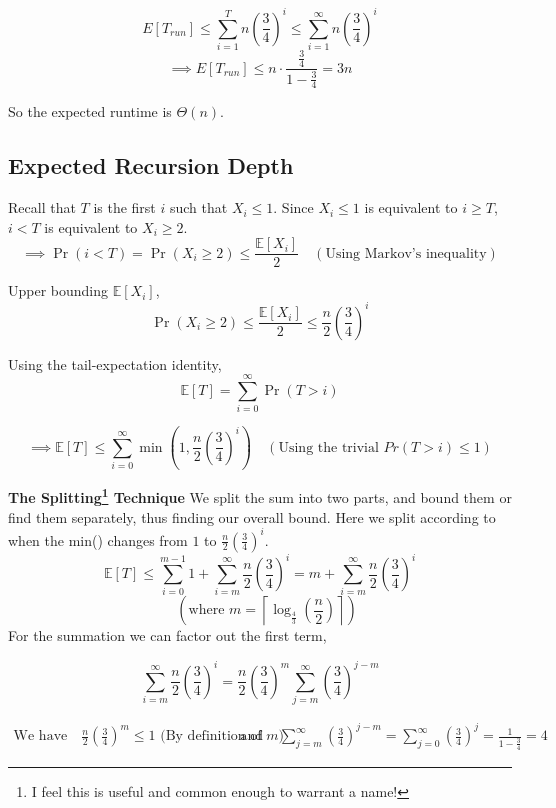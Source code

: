 \documentclass[11pt,openany]{book}
\begin{document}
\[
E[T_{run}] \le \sum_{i=1}^T n (\frac{3}{4})^i \le \sum_{i=1}^{\infty} n(\frac{3}{4})^i 
\]
\[
\implies E[T_{run}] \le n \cdot \frac{\frac{3}{4}}{1-\frac{3}{4}} = 3n
\]

So the expected runtime is \(\Theta(n)\).
\subsection{Expected Recursion Depth}

Recall that $T$ is the first $i$ such that $X_i \le 1$.
Since $X_i \le 1$ is equivalent to $i\ge T$, $i<T$ is equivalent to $X_i \ge 2$.
\[
\implies \Pr(i<T)
=
\Pr(X_i\ge2)
\le
\frac{\mathbb E[X_i]}{2}
\quad(\text{Using Markov's inequality})
\]

\noindent Upper bounding $\mathbb E[X_i]$,
\[
\Pr(X_i\ge2)
\le
\frac{\mathbb E[X_i]}{2}
\le
\frac n2\left(\frac34\right)^i
\]

\noindent Using the tail-expectation identity,
\[
\mathbb E[T]
=
\sum_{i=0}^{\infty}\Pr(T>i)
\]

\[
\implies
\mathbb E[T]
\le
\sum_{i=0}^{\infty}
\min\left(1,\frac n2\left(\frac34\right)^i\right) \quad (\text{Using the trivial } Pr(T>i) \le 1)
\]

\vspace{0.6em}
\noindent \textbf{The Splitting\footnote{I feel this is useful and common enough to warrant a name!} Technique}
We split the sum into two parts, and bound them or find 
them separately, thus finding our overall bound. Here we split according to when 
the min() changes from $1$ to $\frac n2\left(\frac34\right)^i$.\\
\[
\mathbb E[T] \le \sum_{i=0}^{m-1} 1 +
\sum_{i=m}^{\infty} \frac{n}{2} \left( \frac{3}{4} \right)^i
=m+ \sum_{i=m}^{\infty} \frac{n}{2} \left( \frac{3}{4} \right)^i
\]
\[
\quad \left(\text{where } m= \left\lceil \log_{\frac{4}{3}} \left( \frac{n}{2} \right) \right\rceil\right)
\]
\vspace{0.5em}
\noindent For the summation we can factor out the first term,

\[
\sum_{i=m}^{\infty} \frac{n}{2} \left( \frac{3}{4} \right)^i
=
\frac n2\left(\frac34\right)^m
\sum_{j=m}^{\infty}
\left(\frac34\right)^{j-m}
\]

\[
\begin{aligned}
\text{We have}\hspace{1em}
\frac n2\left(\frac34\right)^m \le 1
\text{ (By definition of }m)
&
\hspace{1em}\text{and }
&
\sum_{j=m}^{\infty}\left(\frac34\right)^{j-m}
=
\sum_{j=0}^{\infty}\left(\frac34\right)^{j}
=
\frac1{1-\frac34}
=
4
\end{aligned}
\]
\end{document}
